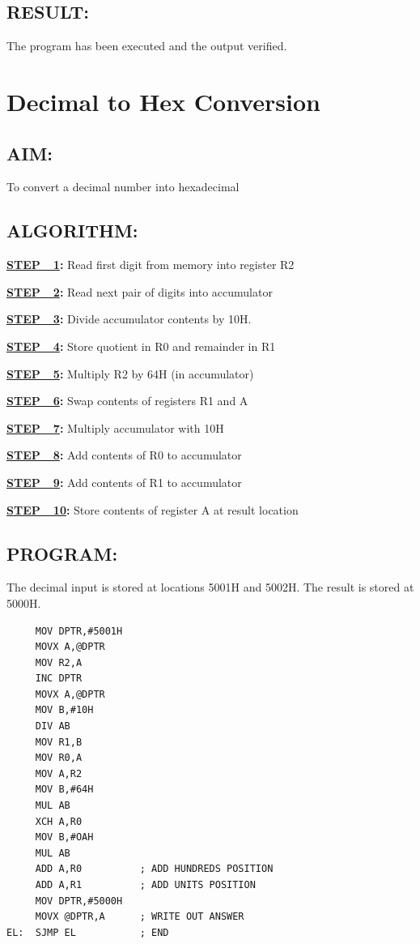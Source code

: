 \documentclass[a4paper,28pt,twoside,openright]{report}
\begin{document}
\section*{RESULT:}
The program has been executed and the output verified.
\chapter{Decimal to Hex Conversion}
\section*{AIM:}
To convert a decimal number into hexadecimal

\section*{ALGORITHM:}

\textbf{\underline{STEP\ \ 1}:} Read first digit from memory into register R2

\textbf{\underline{STEP\ \ 2}:} Read next pair of digits into accumulator

\textbf{\underline{STEP\ \ 3}:} Divide accumulator contents by 10H.

\textbf{\underline{STEP\ \ 4}:} Store quotient in R0 and remainder in R1

\textbf{\underline{STEP\ \ 5}:} Multiply R2 by 64H (in accumulator)

\textbf{\underline{STEP\ \ 6}:} Swap contents of registers R1 and A

\textbf{\underline{STEP\ \ 7}:} Multiply accumulator with 10H

\textbf{\underline{STEP\ \ 8}:} Add contents of R0 to accumulator

\textbf{\underline{STEP\ \ 9}:} Add contents of R1 to accumulator

\textbf{\underline{STEP\ \ 10}:} Store contents of register A at result location

\section*{PROGRAM:}
The decimal input is stored at locations 5001H and 5002H. The result is stored at 5000H.

\begin{lstlisting}
     MOV DPTR,#5001H
     MOVX A,@DPTR
     MOV R2,A
     INC DPTR
     MOVX A,@DPTR
     MOV B,#10H
     DIV AB
     MOV R1,B
     MOV R0,A
     MOV A,R2
     MOV B,#64H
     MUL AB
     XCH A,R0
     MOV B,#OAH
     MUL AB
     ADD A,R0          ; ADD HUNDREDS POSITION
     ADD A,R1          ; ADD UNITS POSITION
     MOV DPTR,#5000H
     MOVX @DPTR,A      ; WRITE OUT ANSWER
EL:  SJMP EL           ; END
\end{lstlisting}
\end{document}
